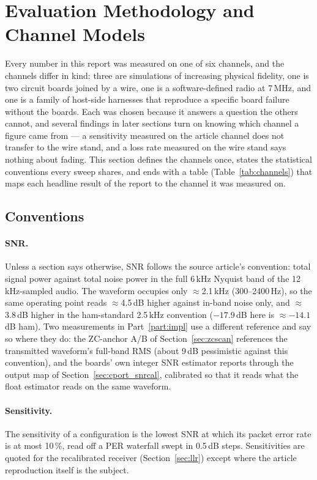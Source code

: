 \section{Evaluation Methodology and Channel Models}
\label{sec:channels}

Every number in this report was measured on one of six channels, and
the channels differ in kind: three are simulations of increasing
physical fidelity, one is two circuit boards joined by a wire, one is a
software-defined radio at 7\,MHz, and one is a family of host-side
harnesses that reproduce a specific board failure without the boards.
Each was chosen because it answers a question the others cannot, and
several findings in later sections turn on knowing which channel a
figure came from --- a sensitivity measured on the article channel does
not transfer to the wire stand, and a loss rate measured on the wire
stand says nothing about fading.  This section defines the channels
once, states the statistical conventions every sweep shares, and ends
with a table (Table~\ref{tab:channels}) that maps each headline result
of the report to the channel it was measured on.

\subsection{Conventions}
\label{sec:conventions}

\paragraph{SNR.}  Unless a section says otherwise, SNR follows the
source article's convention: total signal power against total noise
power in the full 6\,kHz Nyquist band of the 12\,kHz-sampled audio.
The waveform occupies only $\approx$2.1\,kHz (300--2400\,Hz), so the
same operating point reads $\approx$4.5\,dB higher against in-band
noise only, and $\approx$3.8\,dB higher in the ham-standard 2.5\,kHz
convention ($-17.9$\,dB here is $\approx-14.1$\,dB ham).  Two
measurements in Part~\ref{part:impl} use a different reference and say
so where they do: the ZC-anchor A/B of Section~\ref{sec:zcscan}
references the transmitted waveform's full-band RMS (about 9\,dB
pessimistic against this convention), and the boards' own integer SNR
estimator reports through the output map of
Section~\ref{sec:cport_snrcal}, calibrated so that it reads what the
float estimator reads on the same waveform.

\paragraph{Sensitivity.}  The sensitivity of a configuration is the
lowest SNR at which its packet error rate is at most 10\,\%, read off a
PER waterfall swept in 0.5\,dB steps.  Sensitivities are quoted for
the recalibrated receiver (Section~\ref{sec:llr}) except where the
article reproduction itself is the subject.

